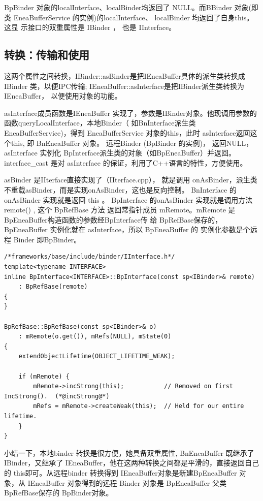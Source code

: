 \documentclass[a4paper,11pt]{article}
\begin{document}
BpBinder 对象的localInterface、localBinder均返回了 NULL。而BBinder 对象(即类
EneaBufferService 的实例)的localInterface、 localBinder 均返回了自身this。这显
示接口的双重属性是 IBinder ， 也是 IInterface。

\subsection{转换：传输和使用} 
这两个属性之间转换，IBinder::asBinder是把IEneaBuffer具体的派生类转换成IBinder
类，以便IPC传输; IEneaBuffer::asInterface是把IBinder派生类转换为IEneaBuffer，
以便使用对象的功能。 

asInterface\label{code:asInterface}成员函数是IEneaBuffer
实现了，参数是IBinder对象。他现调用参数的函数queryLocalInterface，本地Binder（
如BnInterface派生类EneaBufferService)，得到 EneaBufferService 对象的this，此时
asInterface返回这个this, 即 BnEneaBuffer 对象。 远程Binder (BpBinder 的实例)，
返回NULL，asInterface 实例化 BpInterface派生类的对象（如BpEneaBuffer）并返回。
interface_cast 是对 asInterface 的保证，利用了C++语言的特性，方便使用。

asBinder 是IIterface直接实现了（IIterface.cpp）， 就是调用
onAsBinder，派生类不重载asBinder，而是实现onAsBinder，这也是反向控制。
BnInterface 的onAsBinder  实现就是返回 this 。
 BpInterface 的onAsBinder 实现就是调用方法 remote() , 这个 BpRefBase 方法
 返回常指针成员 mRemote。mRemote 是 BpEneaBuffer构造函数的参数经BpInterface传
 给 BpRefBase保存的，BpEneaBuffer 实例化就在 asInterface，所以 BpEneaBuffer 的
 实例化参数是个远程 Binder 即BpBinder。

\begin{lstlisting}[caption=BpInterface 的构造函数,label={BpInterfaceConstructor}]
/*frameworks/base/include/binder/IInterface.h*/
template<typename INTERFACE>
inline BpInterface<INTERFACE>::BpInterface(const sp<IBinder>& remote)
    : BpRefBase(remote)
{
}

BpRefBase::BpRefBase(const sp<IBinder>& o)
    : mRemote(o.get()), mRefs(NULL), mState(0)
{
    extendObjectLifetime(OBJECT_LIFETIME_WEAK);

    if (mRemote) {
        mRemote->incStrong(this);           // Removed on first IncStrong().  (*@incStrong@*)
        mRefs = mRemote->createWeak(this);  // Held for our entire lifetime.
    }
}

\end{lstlisting} 

小结一下，本地binder 转换是很方便，她具备双重属性, BnEneaBuffer 既继承了
IBinder，又继承了 IEneaBuffer，他在这两种转换之间都是平滑的，直接返回自己的
this即可。从远程binder 转换得到 IEneaBuffer对象是新建BpEneaBuffer 对象，从
IEneaBuffer 对象得到的远程 Binder 对象是 BpEneaBuffer 父类 BpRefBase保存的
BpBinder对象。
 
\end{document}
